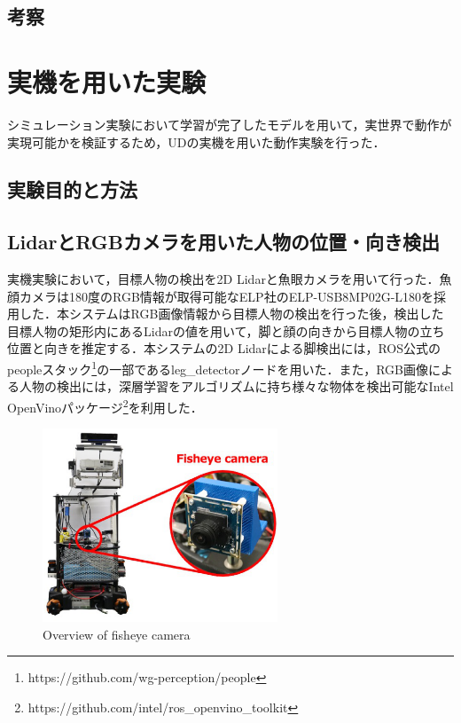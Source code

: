 \documentclass[12pt]{sonota/aislab}
\begin{document}
\subsection{考察}


\section{実機を用いた実験}
シミュレーション実験において学習が完了したモデルを用いて，実世界で動作が実現可能かを検証するため，UDの実機を用いた動作実験を行った．

\subsection{実験目的と方法}
\subsection{LidarとRGBカメラを用いた人物の位置・向き検出}
実機実験において，目標人物の検出を2D Lidarと魚眼カメラを用いて行った．魚顔カメラは180度のRGB情報が取得可能なELP社のELP-USB8MP02G-L180を採用した．本システムはRGB画像情報から目標人物の検出を行った後，検出した目標人物の矩形内にあるLidarの値を用いて，脚と顔の向きから目標人物の立ち位置と向きを推定する．本システムの2D Lidarによる脚検出には，ROS公式のpeopleスタック\footnote{https://github.com/wg-perception/people}の一部であるleg\_detectorノードを用いた．また，RGB画像による人物の検出には，深層学習をアルゴリズムに持ち様々な物体を検出可能なIntel OpenVinoパッケージ\footnote{https://github.com/intel/ros\_openvino\_toolkit}を利用した．

\begin{figure}[t]
\begin{center}
\includegraphics[clip, width=7cm]{figs/ud_with_fisheyecamera.eps}
\caption{Overview of fisheye camera}
\label{ud_with_fisheyecamera}
\end{center}
\end{figure}
\end{document}
